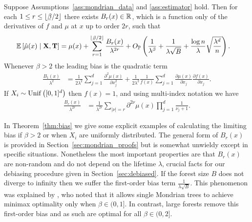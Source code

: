 \begin{theorem}%
  \label{thm:bias}
  Suppose Assumptions~\ref{ass:mondrian_data} and \ref{ass:estimator} hold.
  Then for each $1 \leq r \leq \lfloor \flbeta / 2 \rfloor$ there exists
  $B_r(x) \in \mathbb{R}$, which is a function only of
  the derivatives of $f$ and $\mu$ at $x$ up to order $2r$,
  such that
  \begin{align*}
    \E \left[ \hat \mu(x) \mid \bX, \bT \right]
    &=
    \mu(x)
    + \sum_{r=1}^{\lfloor \flbeta / 2 \rfloor}
    \frac{B_r(x)}{\lambda^{2r}}
    + O_\P \left(
      \frac{1}{\lambda^\beta}
      + \frac{1}{\lambda \sqrt B}
      + \frac{\log n}{\lambda} \sqrt{\frac{\lambda^d}{n}}
    \right).
  \end{align*}
  Whenever $\beta > 2$ the leading bias is the quadratic term
  \begin{align*}
    \frac{B_1(x)}{\lambda^2}
    &=
    \frac{1}{2 \lambda^2}
    \sum_{j=1}^d \frac{\partial^2 \mu(x)}{\partial x_j^2}
    + \frac{1}{2 \lambda^2}
    \frac{1}{f(x)}
    \sum_{j=1}^{d} \frac{\partial \mu(x)}{\partial x_j}
    \frac{\partial f(x)}{\partial x_j}.
  \end{align*}
  If $X_i \sim \operatorname{Unif}\big([0,1]^d\big)$ then $f(x) = 1$,
  and using multi-index notation we have
  \begin{align*}
    \frac{B_r(x)}{\lambda^{2r}}
    &=
    \frac{1}{\lambda^{2r}}
    \sum_{|\nu|=r}
    \partial^{2 \nu} \mu(x)
    \prod_{j=1}^d
    \frac{1}{\nu_j + 1}.
  \end{align*}
\end{theorem}

In Theorem~\ref{thm:bias} we give some explicit examples
of calculating the limiting bias if $\beta > 2$
or when $X_i$ are uniformly distributed.
The general form of $B_r(x)$ is provided in
Section~\ref{sec:mondrian_proofs}
but is somewhat unwieldy except
in specific situations.
Nonetheless the most important properties are that $B_r(x)$
are non-random and
do not depend on the lifetime $\lambda$,
crucial facts for our debiasing procedure given in
Section~\ref{sec:debiased}.
If the forest size $B$ does not diverge to infinity
then we suffer the first-order bias term $\frac{1}{\lambda \sqrt B}$.
This phenomenon was explained by \citet{mourtada2020minimax},
who noted that it allows single Mondrian trees to achieve
minimax optimality only when $\beta \in (0, 1]$.
In contrast, large forests remove this first-order bias
and as such are optimal for all $\beta \in (0, 2]$.

